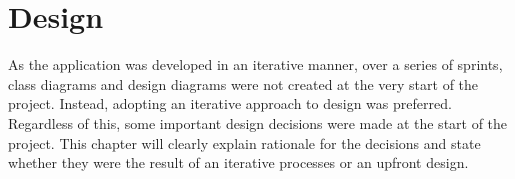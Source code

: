 \chapter{Design}\label{chapt:design}







As the application was developed in an iterative manner, over a series of sprints, class diagrams and design diagrams were not created at the very start of the project. Instead, adopting an iterative approach to design was preferred. Regardless of this, some important design decisions were made at the start of the project. This chapter will clearly explain rationale for the decisions and state whether they were the result of an iterative processes or an upfront design.

